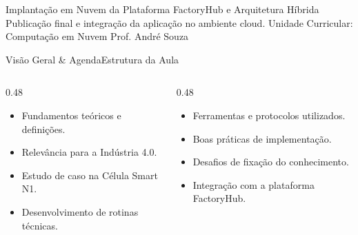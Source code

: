 
\senaicover
  {Implantação em Nuvem da Plataforma FactoryHub e Arquitetura Híbrida}
  {Publicação final e integração da aplicação no ambiente cloud.}
  {Unidade Curricular: Computação em Nuvem}
  {Prof. André Souza}

\begin{senaiframe}{Visão Geral \& Agenda}{Estrutura da Aula}
  \begin{columns}[t]
    \begin{column}{0.48\textwidth}
      \begin{tcolorbox}[senaibluecard, title={1. Conceitos Chave}]
        \begin{itemize}
          \item Fundamentos teóricos e definições.
          \item Relevância para a Indústria 4.0.
        \end{itemize}
      \end{tcolorbox}
      \vspace{4pt}
      \begin{tcolorbox}[senaiambercard, title={3. Aplicação Prática}]
        \begin{itemize}
          \item Estudo de caso na Célula Smart N1.
          \item Desenvolvimento de rotinas técnicas.
        \end{itemize}
      \end{tcolorbox}
    \end{column}
    \begin{column}{0.48\textwidth}
      \begin{tcolorbox}[senairedcard, title={2. Detalhamento Técnico}]
        \begin{itemize}
          \item Ferramentas e protocolos utilizados.
          \item Boas práticas de implementação.
        \end{itemize}
      \end{tcolorbox}
      \vspace{4pt}
      \begin{tcolorbox}[senaigreencard, title={4. Exercícios \& Avaliação}]
        \begin{itemize}
          \item Desafios de fixação do conhecimento.
          \item Integração com a plataforma FactoryHub.
        \end{itemize}
      \end{tcolorbox}
    \end{column}
  \end{columns}
\end{senaiframe}

